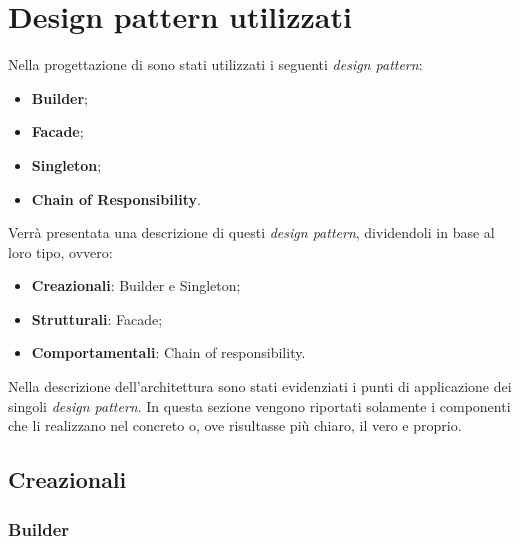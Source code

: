 \newpage
\section{Design pattern utilizzati}
Nella progettazione di  sono stati utilizzati i seguenti \textit{design pattern}:
\begin{itemize}
\item \textbf{Builder};
\item \textbf{Facade};
\item \textbf{Singleton};
\item \textbf{Chain of Responsibility}.
\end{itemize}
Verrà presentata una descrizione di questi \textit{design pattern}, dividendoli in base al loro tipo, ovvero:
\begin{itemize}
\item \textbf{Creazionali}: Builder e Singleton;
\item \textbf{Strutturali}: Facade;
\item \textbf{Comportamentali}: Chain of responsibility.
\end{itemize}
Nella descrizione dell'architettura sono stati evidenziati i punti di applicazione dei singoli \textit{design pattern}. In questa sezione vengono riportati solamente i componenti che li realizzano nel concreto o, ove risultasse più chiaro, il  vero e proprio.
\subsection{Creazionali}
\subsubsection{Builder}
